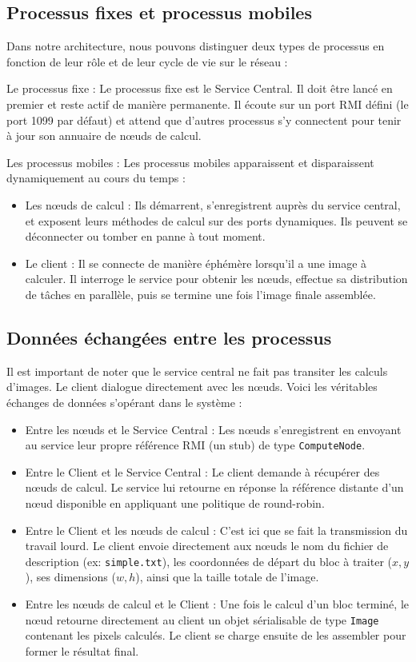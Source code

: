 \documentclass[a4paper,11pt]{article}
\begin{document}
\subsection{Processus fixes et processus mobiles}

Dans notre architecture, nous pouvons distinguer deux types de processus en fonction de leur rôle et de leur cycle de vie sur le réseau :

Le processus fixe :
Le processus fixe est le Service Central. Il doit être lancé en premier et reste actif de manière permanente. Il écoute sur un port RMI défini (le port 1099 par défaut) et attend que d'autres processus s'y connectent pour tenir à jour son annuaire de nœuds de calcul.

Les processus mobiles :
Les processus mobiles apparaissent et disparaissent dynamiquement au cours du temps :
\begin{itemize}
    \item Les nœuds de calcul : Ils démarrent, s'enregistrent auprès du service central, et exposent leurs méthodes de calcul sur des ports dynamiques. Ils peuvent se déconnecter ou tomber en panne à tout moment.
    \item Le client : Il se connecte de manière éphémère lorsqu'il a une image à calculer. Il interroge le service pour obtenir les nœuds, effectue sa distribution de tâches en parallèle, puis se termine une fois l'image finale assemblée.
\end{itemize}

\subsection{Données échangées entre les processus}

Il est important de noter que le service central ne fait pas transiter les calculs d'images. Le client dialogue directement avec les nœuds. Voici les véritables échanges de données s'opérant dans le système :

\begin{itemize}
    \item Entre les nœuds et le Service Central : Les nœuds s'enregistrent en envoyant au service leur propre référence RMI (un stub) de type \texttt{ComputeNode}.
    \item Entre le Client et le Service Central : Le client demande à récupérer des nœuds de calcul. Le service lui retourne en réponse la référence distante d'un nœud disponible en appliquant une politique de round-robin.
    \item Entre le Client et les nœuds de calcul : C'est ici que se fait la transmission du travail lourd. Le client envoie directement aux nœuds le nom du fichier de description (ex: \texttt{simple.txt}), les coordonnées de départ du bloc à traiter ($x, y$), ses dimensions ($w, h$), ainsi que la taille totale de l'image.
    \item Entre les nœuds de calcul et le Client : Une fois le calcul d'un bloc terminé, le nœud retourne directement au client un objet sérialisable de type \texttt{Image} contenant les pixels calculés. Le client se charge ensuite de les assembler pour former le résultat final.
\end{itemize}
\end{document}
